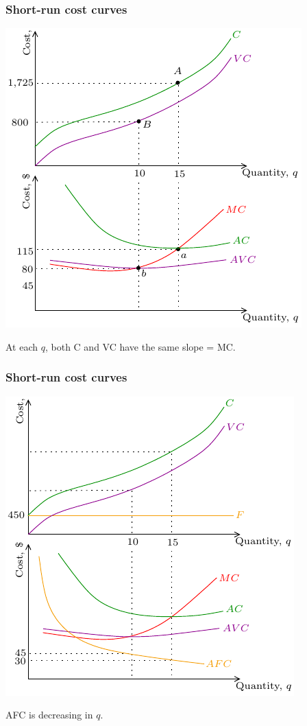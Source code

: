 \documentclass[xcolor=pdftex,dvipsnames]{beamer}
\begin{document}
\begin{frame}
\frametitle{Short-run cost curves}
\begin{center}
\includegraphics{pics/ShortRunCC6}
\end{center}
At each $q$, both C and VC have the same slope = MC.
\end{frame}

\begin{frame}
\frametitle{Short-run cost curves}
\begin{center}
\includegraphics{pics/ShortRunCC7}
\end{center}
AFC is decreasing in $q$.
\end{frame}
\end{document}
